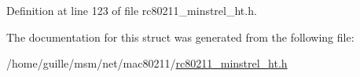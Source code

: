 Definition at line 123 of file rc80211\-\_\-minstrel\-\_\-ht.\-h.



The documentation for this struct was generated from the following file\-:\begin{DoxyCompactItemize}
\item 
/home/guille/msm/net/mac80211/\hyperlink{rc80211__minstrel__ht_8h}{rc80211\-\_\-minstrel\-\_\-ht.\-h}\end{DoxyCompactItemize}
